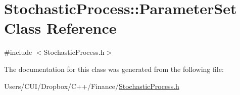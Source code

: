 \hypertarget{class_stochastic_process_1_1_parameter_set}{}\section{Stochastic\+Process\+:\+:Parameter\+Set Class Reference}
\label{class_stochastic_process_1_1_parameter_set}


{\ttfamily \#include $<$Stochastic\+Process.\+h$>$}



The documentation for this class was generated from the following file\+:\begin{DoxyCompactItemize}
\item 
Users/\+C\+U\+I/\+Dropbox/\+C++/\+Finance/\hyperlink{_stochastic_process_8h}{Stochastic\+Process.\+h}\end{DoxyCompactItemize}
